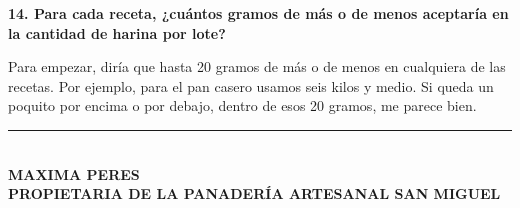 \par\medskip

\noindent
\textbf{14. Para cada receta, ¿cuántos gramos de más o de menos aceptaría en la cantidad de harina por lote?}

Para empezar, diría que hasta 20 gramos de más o de menos en cualquiera de las recetas. Por ejemplo, para el pan casero usamos seis kilos y medio. Si queda un poquito por encima o por debajo, dentro de esos 20 gramos, me parece bien.

\begin{center}
    \vspace{1.5cm}
    \hspace*{0pt}
    \textcolor{gray}{\rule{180pt}{0.1pt}}
    \vspace{-0.2cm}\\
    \MakeUppercase{\bf{ Maxima Peres }}\\[-0.2cm]
    \MakeUppercase{\bf{ Propietaria de la panadería artesanal san miguel}}\\ 
\end{center}